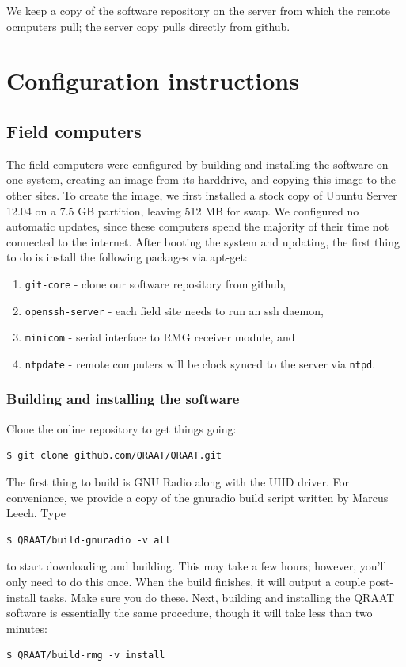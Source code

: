 \documentclass[letter]{article}
\begin{document}
We keep a copy of the software repository on the server from which the remote ocmputers pull; the server 
copy pulls directly from github. 




\section{Configuration instructions}

\subsection{Field computers}
The field computers were configured by building and installing the software on one 
system, creating an image from its harddrive, and copying this image to the other sites. To create
the image, we first installed a stock copy of Ubuntu Server 12.04 on a 7.5 GB partition, leaving
512 MB for swap. We configured no automatic updates, since these computers spend the majority of 
their time not connected to the internet. After booting the system and updating, the first thing
to do is install the following packages via apt-get: 
\begin{enumerate}
  \item \texttt{git-core} - clone our software repository from github,
  \item \texttt{openssh-server} - each field site needs to run an ssh daemon,
  \item \texttt{minicom} - serial interface to RMG receiver module, and
  \item \texttt{ntpdate} - remote computers will be clock synced to the server via \texttt{ntpd}. 
\end{enumerate}

\subsubsection{Building and installing the software}
Clone the online repository to get things going:
\begin{verbatim}
$ git clone github.com/QRAAT/QRAAT.git
\end{verbatim}
The first thing to build is GNU Radio along with the UHD driver. For conveniance, we provide a copy 
of the gnuradio build script written by Marcus Leech. Type
\begin{verbatim}
$ QRAAT/build-gnuradio -v all
\end{verbatim}
to start downloading and building. This may take a few hours; however, you'll only need to do this once. When the 
build finishes, it will output a couple post-install tasks. Make sure you do these. Next, building
and installing the QRAAT software is essentially the same procedure, though it will take less than 
two minutes: 
\begin{verbatim}
$ QRAAT/build-rmg -v install
\end{verbatim}
\end{document}
